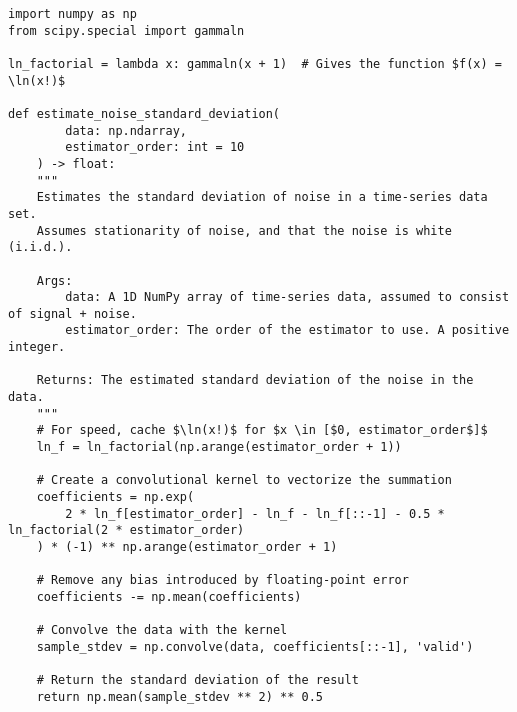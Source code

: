 \begin{listing}[H]
    \begin{verbatim}
import numpy as np
from scipy.special import gammaln

ln_factorial = lambda x: gammaln(x + 1)  # Gives the function $f(x) = \ln(x!)$

def estimate_noise_standard_deviation(
        data: np.ndarray,
        estimator_order: int = 10
    ) -> float:
    """
    Estimates the standard deviation of noise in a time-series data set.
    Assumes stationarity of noise, and that the noise is white (i.i.d.).

    Args:
        data: A 1D NumPy array of time-series data, assumed to consist of signal + noise.
        estimator_order: The order of the estimator to use. A positive integer.

    Returns: The estimated standard deviation of the noise in the data.
    """
    # For speed, cache $\ln(x!)$ for $x \in [$0, estimator_order$]$
    ln_f = ln_factorial(np.arange(estimator_order + 1))

    # Create a convolutional kernel to vectorize the summation
    coefficients = np.exp(
        2 * ln_f[estimator_order] - ln_f - ln_f[::-1] - 0.5 * ln_factorial(2 * estimator_order)
    ) * (-1) ** np.arange(estimator_order + 1)

    # Remove any bias introduced by floating-point error
    coefficients -= np.mean(coefficients)

    # Convolve the data with the kernel
    sample_stdev = np.convolve(data, coefficients[::-1], 'valid')

    # Return the standard deviation of the result
    return np.mean(sample_stdev ** 2) ** 0.5
    \end{verbatim}
    \caption{Example efficient implementation of the arbitrary-order noise estimator using NumPy/SciPy in Python 3.}
    \label{lst:efficient_arbitrary_order_noise_estimator}
\end{listing}
